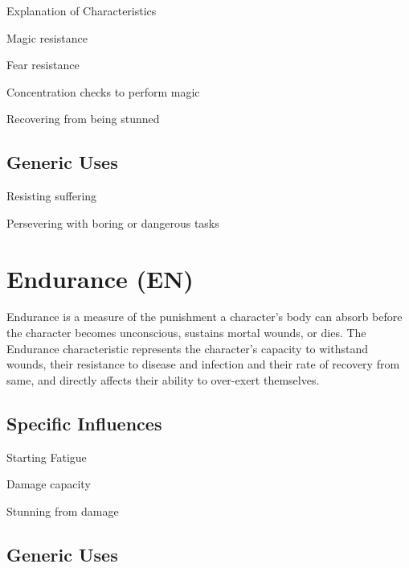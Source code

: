 \begin{Chapter}{Explanation of Characteristics}
\begin{Itemize}
\item Magic resistance  

\item Fear resistance  

\item Concentration checks to perform magic  

\item Recovering from being stunned 

\end{Itemize}

\subsection{Generic Uses}

\begin{Itemize}

\item Resisting suffering  

\item Persevering with boring or dangerous tasks

\end{Itemize}


\section{Endurance (EN)}

Endurance is a measure of the punishment a character’s body can absorb
before the character becomes unconscious, sustains mortal wounds, or
dies.  The Endurance characteristic represents the character’s
capacity to withstand wounds, their resistance to disease and
infection and their rate of recovery from same, and directly affects
their ability to over-exert themselves.

\subsection{Specific Influences}

\begin{Itemize}

\item Starting Fatigue  

\item Damage capacity  

\item Stunning from damage 

\end{Itemize}

\subsection{Generic Uses}


\end{Chapter}
